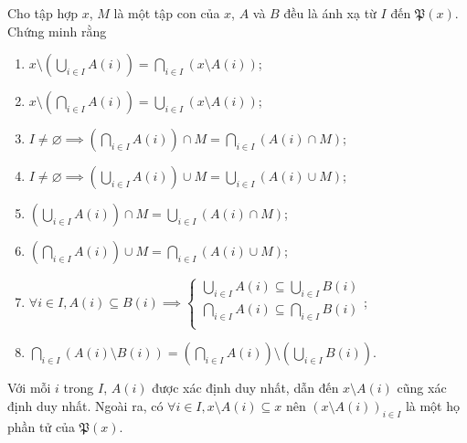 \exercise Cho tập hợp $x$, $M$ là một tập con của $x$, $A$ và $B$ đều là ánh xạ từ $I$ đến $\mathfrak{P}(x)$. Chứng minh rằng
\begin{enumerate}
   \item $x \setminus \left(\bigcup_{i \in I}A(i)\right) = \bigcap_{i \in I}(x \setminus A(i))$;
   \item $x \setminus \left(\bigcap_{i \in I}A(i)\right) = \bigcup_{i \in I}(x \setminus A(i))$;
   \item $I \neq \varnothing \implies \left(\bigcap_{i \in I}A(i)\right) \cap M = \bigcap_{i \in I}\left(A(i) \cap M\right)$;
   \item $I \neq \varnothing \implies \left(\bigcup_{i \in I}A(i)\right) \cup M = \bigcup_{i \in I}\left(A(i) \cup M\right)$;
   \item $\left(\bigcup_{i \in I}A(i)\right) \cap M = \bigcup_{i \in I}\left(A(i) \cap M\right)$;
   \item $\left(\bigcap_{i \in I}A(i)\right) \cup M = \bigcap_{i \in I}\left(A(i) \cup M\right)$;
   \item $\forall i \in I, A(i) \subseteq B(i) \implies \begin{cases}
      \bigcup_{i \in I} A(i) \subseteq \bigcup_{i \in I}B(i) \\
      \bigcap_{i \in I} A(i) \subseteq \bigcap_{i \in I}B(i) \\
   \end{cases}$;
   \item $\bigcap_{i \in I}\left(A(i) \setminus B(i)\right) = \left(\bigcap_{i \in I}A(i)\right) \setminus \left(\bigcup_{i \in I}B(i)\right)$.
\end{enumerate} 

\solution 

\resetSubexercise Với mỗi $i$ trong $I$, $A(i)$ được xác định duy nhất, dẫn đến $x \setminus A(i)$ cũng xác định duy nhất. Ngoài ra, có $\forall i \in I, x \setminus A(i) \subseteq x$ nên $\left(x \setminus A(i)\right)_{i \in I}$ là một họ phần tử của $\mathfrak{P}(x)$.


